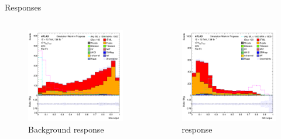 \begin{frame}{Responses}
  \begin{columns}
    \begin{column}{0.5\textwidth}
      \begin{figure}
      \centering \includegraphics[width=\textwidth]{response_bkg}
      \caption{Background response}
      \end{figure}
    \end{column}
    \begin{column}{0.5\textwidth}
      \begin{figure}
      \centering \includegraphics[width=\textwidth]{response_tZq}
      \caption{\tZq response}
      \end{figure}
    \end{column}
  \end{columns}
\end{frame}


